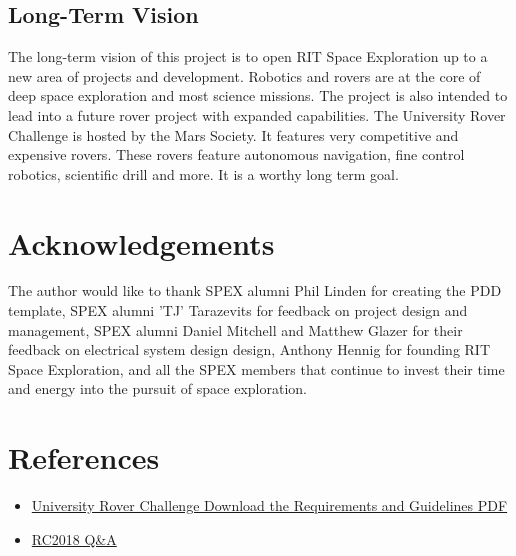 \documentclass[conference]{IEEEtran} %
\begin{document}
\subsection{Long-Term Vision}
\label{subsec:vision}
The long-term vision of this project is to open RIT Space Exploration up to a new area of projects and development. 
Robotics and rovers are at the core of deep space exploration and most science missions. 
The project is also intended to lead into a future rover project with expanded capabilities.
The University Rover Challenge is hosted by the Mars Society. 
It features very competitive and expensive rovers. 
These rovers feature autonomous navigation, fine control robotics, scientific drill and more. 
It is a worthy long term goal. 

\section*{Acknowledgements}
The author would like to thank SPEX alumni Phil Linden for creating the PDD template, SPEX alumni 'TJ' Tarazevits for feedback on project design and management, SPEX alumni Daniel Mitchell and Matthew Glazer for their feedback on electrical system design design, Anthony Hennig for founding RIT Space Exploration, and all the SPEX members that continue to invest their time and energy into the pursuit of space exploration. 

\section{References}
\begin{itemize}
  \item \href{http://urc.marssociety.org/files/University%20Rover%20Challenge%20Rules%202018.pdf}{University Rover Challenge Download the Requirements and Guidelines PDF}
  \item \href{http://urc.marssociety.org/home/q-a}{RC2018 Q\&A}
\end{itemize}
\onecolumn
\appendices{}
\end{document}
